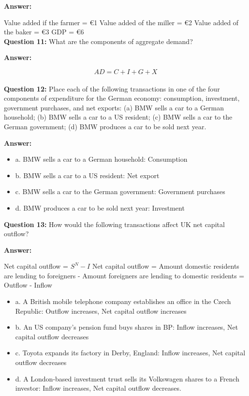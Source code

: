 \documentclass[a4paper, 11pt]{article}
\begin{document}
\textbf{Answer:} 

Value added if the farmer = €1
Value added of the miller = €2
Value added of the baker = €3
GDP = €6  \\

\textbf{Question 11:} What are the components of aggregate demand?

\textbf{Answer:} 

$$AD = C + I + G + X$$ \\

\textbf{Question 12:} Place each of the following transactions in one of the four components of expenditure for the German economy: consumption, investment, government purchases, and net exports: (a) BMW sells a car to a German household; (b) BMW sells a car to a US resident; (c) BMW sells a car to the German government; (d) BMW produces a car to be sold next year.

\textbf{Answer:} 
\begin{itemize}
\item a. BMW sells a car to a German household: Consumption
\item b. BMW sells a car to a US resident: Net export
\item c. BMW sells a car to the German government: Government purchases
\item d. BMW produces a car to be sold next year: Investment   \\
\end{itemize}

\textbf{Question 13:} How would the following transactions affect UK net capital outflow?

\textbf{Answer:}

Net capital outflow =  $S^{N} - I$
Net capital outflow = Amount domestic residents are lending to foreigners - Amount foreigners are lending to domestic residents = Outflow - Inflow

\begin{itemize}

\item a. A British mobile telephone company establishes an office in the Czech Republic: Outflow increases, Net capital outflow increases
\item b. An US company’s pension fund buys shares in BP: Inflow increases, Net capital outflow decreases
\item c. Toyota expands its factory in Derby, England: Inflow increases, Net capital outflow decreases
\item d. A London-based investment trust sells its Volkswagen shares to a French investor: Inflow increases, Net capital outflow decreases. 
\end{itemize}
\end{document}

